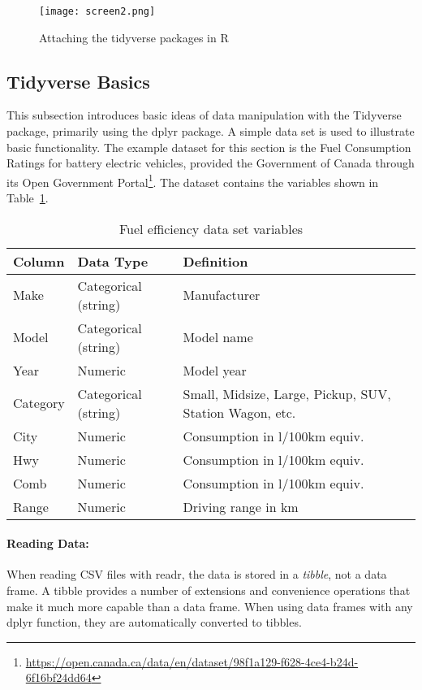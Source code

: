\begin{figure}
\centering
\texttt{[image: screen2.png]}
\caption{Attaching the tidyverse packages in R}
\label{fig:tidyverse}
\end{figure}

\subsection*{Tidyverse Basics}

This subsection introduces basic ideas of data manipulation with the Tidyverse package, primarily using the dplyr package. A simple data set is used to illustrate basic functionality. The example dataset for this section is the Fuel Consumption Ratings for battery electric vehicles, provided the Government of Canada through its Open Government Portal\footnote{\scriptsize\url{https://open.canada.ca/data/en/dataset/98f1a129-f628-4ce4-b24d-6f16bf24dd64}}. The dataset contains the variables shown in Table~\ref{tab:fueldatachapter5}.

\begin{table}[h]
\centering
\renewcommand{\arraystretch}{1.25}

\begin{tabularx}{.9\linewidth}{|l|l|X|} \hline
  {\bf Column} & {\bf Data Type} & {\bf Definition} \\ \hline \hline
  Make & Categorical (string) & Manufacturer \\ 
  Model & Categorical (string) & Model name\\
  Year & Numeric & Model year \\
  Category & Categorical (string) & Small, Midsize, Large, Pickup, SUV, Station Wagon, etc. \\
  City & Numeric & Consumption in l/100km equiv. \\
  Hwy & Numeric & Consumption in l/100km equiv. \\
  Comb & Numeric & Consumption in l/100km equiv. \\
  Range & Numeric & Driving range in km \\ \hline
\end{tabularx}
\caption{Fuel efficiency data set variables}
\label{tab:fueldatachapter5}
\end{table}

\paragraph*{Reading Data:} When reading CSV files with readr, the data is stored in a \emph{tibble}, not a data frame. A tibble provides a number of extensions and convenience operations that make it much more capable than a data frame. When using data frames with any dplyr function, they are automatically converted to tibbles. 

